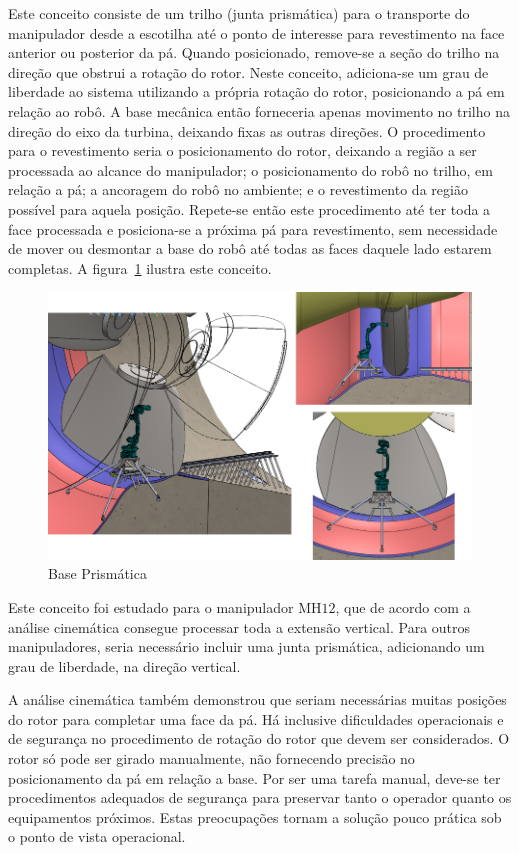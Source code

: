   Este conceito consiste de um trilho (junta prismática) para o transporte do
  manipulador desde a escotilha até o ponto de interesse para revestimento na
  face anterior ou posterior da pá. Quando posicionado, remove-se a seção
  do trilho na direção que obstrui a rotação do rotor. Neste conceito,
  adiciona-se um grau de liberdade ao sistema utilizando a própria rotação do
  rotor, posicionando a pá em relação ao robô. A base mecânica então forneceria
  apenas movimento no trilho na direção do eixo da turbina, deixando fixas as
  outras direções. O procedimento para o revestimento seria o posicionamento do
  rotor, deixando a região a ser processada ao alcance do manipulador; o
  posicionamento do robô no trilho, em relação a pá; a ancoragem do robô
  no ambiente; e o revestimento da região possível para aquela posição.
  Repete-se então este procedimento até ter toda a face processada e
  posiciona-se a próxima pá para revestimento, sem necessidade de mover ou
  desmontar a base do robô até todas as faces daquele lado estarem completas.  A
  figura~\ref{fig::base_p} ilustra este conceito.
  
  \begin{figure}[h!]
   \centering
   \includegraphics[width=0.8\columnwidth]{detail/figs/bases/base_p}
   \caption{Base Prismática}
   \label{fig::base_p}
\end{figure}
  
  Este conceito foi estudado para o manipulador MH$12$, que de acordo com a
  análise cinemática consegue processar toda a extensão vertical. Para outros
  manipuladores, seria necessário incluir uma junta prismática, adicionando um
  grau de liberdade, na direção vertical.
  
  A análise cinemática também demonstrou que seriam necessárias muitas posições
  do rotor para completar uma face da pá. Há inclusive dificuldades operacionais e
  de segurança no procedimento de rotação do rotor que devem ser considerados. O
  rotor só pode ser girado manualmente, não fornecendo precisão no
  posicionamento da pá em relação a base. Por ser uma tarefa manual, deve-se ter
  procedimentos adequados de segurança para preservar tanto o operador quanto os
  equipamentos próximos. Estas preocupações tornam a solução pouco prática sob o
  ponto de vista operacional.

